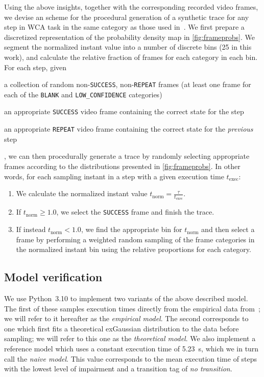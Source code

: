 Using the above insights, together with the corresponding recorded video frames, we devise an scheme for the procedural generation of a synthetic trace for any step in \ac{WCA} task in the same category as those used in~\cite{olguinmunoz:impact2021}.
We first prepare a discretized representation of the probability density map in \cref{fig:frameprobs}.
We segment the normalized instant value into a number of discrete bins (\num{25} in this work), and calculate the relative fraction of frames for each category in each bin.
For each step, given
\begin{enumerate*}[itemjoin={{; }}, itemjoin*={{; and }}]
    \item a collection of random non-\texttt{SUCCESS}, non-\texttt{REPEAT} frames (at least one frame for each of the \texttt{BLANK} and \texttt{LOW\_CONFIDENCE} categories)
    \item an appropriate \texttt{SUCCESS} video frame containing the correct state for the step
    \item an appropriate \texttt{REPEAT} video frame containing the correct state for the \emph{previous} step
\end{enumerate*},
we can then procedurally generate a trace by randomly selecting appropriate frames according to the distributions presented in \cref{fig:frameprobs}.
In other words, for each sampling instant in a step with a given execution time \( t_\text{exec} \):
\begin{enumerate}
    \item We calculate the normalized instant value \( t_\text{norm} = \frac{\tau}{t_\text{exec}} \).
    \item If \( t_\text{norm} \ge 1.0 \), we select the \texttt{SUCCESS} frame and finish the trace.
    \item If instead \( t_\text{norm} < 1.0 \), we find the appropriate bin for \( t_\text{norm} \) and then select a frame by performing a weighted random sampling of the frame categories in the normalized instant bin using the relative proportions for each category.
\end{enumerate}

\subsection{Model verification}

We use Python~\num{3.10} to implement two variants of the above described model.
The first of these samples execution times directly from the empirical data from~\cite{olguinmunoz:impact2021}; we will refer to it hereafter as the \emph{empirical model}.
The second corresponds to one which first fits a theoretical \ac{exGaussian} distribution to the data before sampling; we will refer to this one as the \emph{theoretical model}.
We also implement a reference model which uses a constant execution time of \SI{5.23}{\second}, which we in turn call the \emph{naive model}.
This value corresponds to the mean execution time of steps with the lowest level of impairment and a transition tag of \emph{no transition}.

